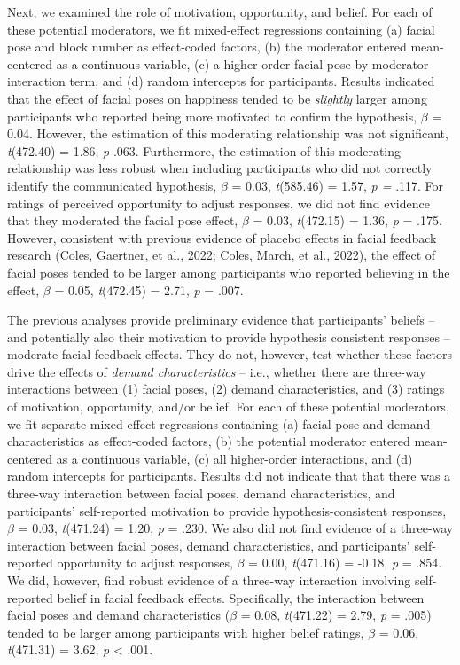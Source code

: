 \documentclass[
  man,floatsintext]{apa6}
\begin{document}
Next, we examined the role of motivation, opportunity, and belief. For each of these potential moderators, we fit mixed-effect regressions containing (a) facial pose and block number as effect-coded factors, (b) the moderator entered mean-centered as a continuous variable, (c) a higher-order facial pose by moderator interaction term, and (d) random intercepts for participants. Results indicated that the effect of facial poses on happiness tended to be \emph{slightly} larger among participants who reported being more motivated to confirm the hypothesis, \(\beta\) = 0.04. However, the estimation of this moderating relationship was not significant, \emph{t}(472.40) = 1.86, \emph{p} .063. Furthermore, the estimation of this moderating relationship was less robust when including participants who did not correctly identify the communicated hypothesis, \(\beta\) = 0.03, \emph{t}(585.46) = 1.57, \emph{p =} .117. For ratings of perceived opportunity to adjust responses, we did not find evidence that they moderated the facial pose effect, \(\beta\) = 0.03, \emph{t}(472.15) = 1.36, \emph{p} = .175. However, consistent with previous evidence of placebo effects in facial feedback research (Coles, Gaertner, et al., 2022; Coles, March, et al., 2022), the effect of facial poses tended to be larger among participants who reported believing in the effect, \(\beta\) = 0.05, \emph{t}(472.45) = 2.71, \emph{p} = .007.

The previous analyses provide preliminary evidence that participants' beliefs -- and potentially also their motivation to provide hypothesis consistent responses -- moderate facial feedback effects. They do not, however, test whether these factors drive the effects of \emph{demand characteristics} -- i.e., whether there are three-way interactions between (1) facial poses, (2) demand characteristics, and (3) ratings of motivation, opportunity, and/or belief. For each of these potential moderators, we fit separate mixed-effect regressions containing (a) facial pose and demand characteristics as effect-coded factors, (b) the potential moderator entered mean-centered as a continuous variable, (c) all higher-order interactions, and (d) random intercepts for participants. Results did not indicate that that there was a three-way interaction between facial poses, demand characteristics, and participants' self-reported motivation to provide hypothesis-consistent responses, \(\beta\) = 0.03, \emph{t}(471.24) = 1.20, \emph{p} = .230. We also did not find evidence of a three-way interaction between facial poses, demand characteristics, and participants' self-reported opportunity to adjust responses, \(\beta\) = 0.00, \emph{t}(471.16) = -0.18, \emph{p} = .854. We did, however, find robust evidence of a three-way interaction involving self-reported belief in facial feedback effects. Specifically, the interaction between facial poses and demand characteristics (\(\beta\) = 0.08, \emph{t}(471.22) = 2.79, \emph{p} = .005) tended to be larger among participants with higher belief ratings, \(\beta\) = 0.06, \emph{t}(471.31) = 3.62, \emph{p} \textless{} .001.
\end{document}
